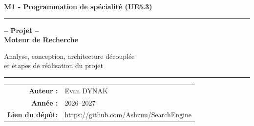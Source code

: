 \documentclass[12pt,a4paper]{article}
\begin{document}
\begin{titlepage}
    \centering
    \vspace*{2cm}

    {\LARGE\textbf{M1 - Programmation de spécialité (UE5.3)}\par}

    \vspace{2.5cm}

    \rule{\linewidth}{1.5pt}\par
    \vspace{0.4cm}
    {\Huge\bfseries\color{primaryblue} -- Projet -- \\Moteur de Recherche\par}
    \vspace{0.3cm}
    {\large Analyse, conception, architecture découplée\\et étapes de réalisation du projet\par}
    \vspace{0.4cm}
    \rule{\linewidth}{1.5pt}\par

    \vspace{2cm}

    \begin{tabular}{rl}
        \textbf{Auteur :}    	& Evan DYNAK \\[4pt]
        \textbf{Année :}     	& 2026--2027 \\[4pt]
        \textbf{Lien du dépôt:}	& \url{https://github.com/Ashzuu/SearchEngine}
    \end{tabular}

\end{titlepage}

\thispagestyle{empty}
\newpage

\begin{abstract}
Ce rapport rend compte de l'analyse, la conception et la réalisation d'un moteur de recherche, développé dans le cadre de l'UE5.3 de Master 1. Le système extrait des publications textuelles depuis deux sources de données : Reddit et Arxiv, assurant la persistance des données dans un format tabulaire optimisé (format de fichier csv), puis applique une indexation vectorielle basée sur le schéma de pondération TF-IDF et le stockage en matrices. L'interrogation par requête utilisateur repose sur la similarité cosinus. L'application est structurée selon une architecture client-serveur moderne découplée : un back-end en Python (FastAPI) exposant une API REST stricte et un front-end en Angular (version 22) conçu en \textit{Single Page Application}. Ce document retrace en détail la démarche d'architecture, les pistes de réflexion, les algorithmes et les tests.
\end{abstract}
\end{document}
